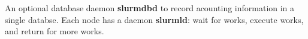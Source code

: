 %  
% 
% 



An optional database daemon {\bf slurmdbd} to record acounting
information in a single databse. Each node has a daemon {\bf slurmld}: wait for
works, execute works, and return for more works.

% 


